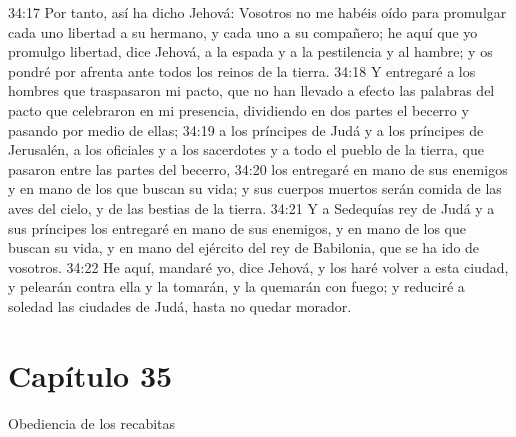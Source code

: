 34:17 Por tanto, así ha dicho Jehová: Vosotros no me habéis oído para promulgar cada uno libertad a su hermano, y cada uno a su compañero; he aquí que yo promulgo libertad, dice Jehová, a la espada y a la pestilencia y al hambre; y os pondré por afrenta ante todos los reinos de la tierra. 
34:18 Y entregaré a los hombres que traspasaron mi pacto, que no han llevado a efecto las palabras del pacto que celebraron en mi presencia, dividiendo en dos partes el becerro y pasando por medio de ellas; 
34:19 a los príncipes de Judá y a los príncipes de Jerusalén, a los oficiales y a los sacerdotes y a todo el pueblo de la tierra, que pasaron entre las partes del becerro, 
34:20 los entregaré en mano de sus enemigos y en mano de los que buscan su vida; y sus cuerpos muertos serán comida de las aves del cielo, y de las bestias de la tierra. 
34:21 Y a Sedequías rey de Judá y a sus príncipes los entregaré en mano de sus enemigos, y en mano de los que buscan su vida, y en mano del ejército del rey de Babilonia, que se ha ido de vosotros. 
34:22 He aquí, mandaré yo, dice Jehová, y los haré volver a esta ciudad, y pelearán contra ella y la tomarán, y la quemarán con fuego; y reduciré a soledad las ciudades de Judá, hasta no quedar morador. 

\section*{Capítulo 35}
Obediencia de los recabitas 
 
